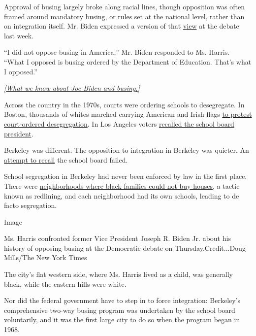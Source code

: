 Approval of busing largely broke along racial lines, though opposition
was often framed around mandatory busing, or rules set at the national
level, rather than on integration itself. Mr. Biden expressed a version
of that
\href{https://www.nytimes3xbfgragh.onion/2019/06/28/us/politics/joe-biden-busing-kamala-harris.html}{view}
at the debate last week.

``I did not oppose busing in America,'' Mr. Biden responded to Ms.
Harris. ``What I opposed is busing ordered by the Department of
Education. That's what I opposed.''

\emph{{[}}\href{https://www.nytimes3xbfgragh.onion/2019/06/28/us/politics/joe-biden-busing-kamala-harris.html}{\emph{What
we know about Joe Biden and busing.}}\emph{{]}}

Across the country in the 1970s, courts were ordering schools to
desegregate. In Boston, thousands of whites marched carrying American
and Irish flags
\href{https://www.nytimes3xbfgragh.onion/1975/10/28/archives/boston-whites-march-in-busing-protest.html}{to
protest court-ordered desegregation}. In Los Angeles voters
\href{https://www.latimes.com/local/lanow/la-me-busing-schools-los-angeles-harris-biden-20190628-story.html}{recalled
the school board president}.

Berkeley was different. The opposition to integration in Berkeley was
quieter. An
\href{https://www.berkeleyschools.net/2018/12/50th-anniversary-of-berkeleys-pioneering-busing-plan-for-school-integration/}{attempt
to recall} the school board failed.

School segregation in Berkeley had never been enforced by law in the
first place. There were
\href{https://www.berkeleyside.com/2018/09/20/redlining-the-history-of-berkeleys-segregated-neighborhoods}{neighborhoods
where black families could not buy houses}, a tactic known as redlining,
and each neighborhood had its own schools, leading to de facto
segregation.

Image

Ms. Harris confronted former Vice President Joseph R. Biden Jr. about
his history of opposing busing at the Democratic debate on
Thursday.Credit...Doug Mills/The New York Times

The city's flat western side, where Ms. Harris lived as a child, was
generally black, while the eastern hills were white.

Nor did the federal government have to step in to force integration:
Berkeley's comprehensive two-way busing program was undertaken by the
school board voluntarily, and it was the first large city to do so when
the program began in 1968.

